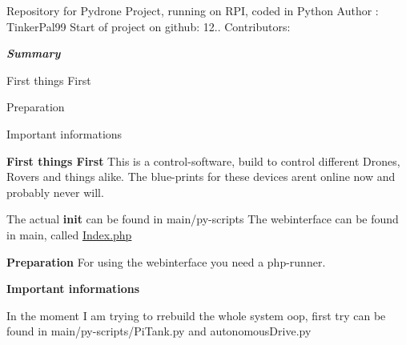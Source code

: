 Repository for Pydrone Project, running on R\+PI, coded in Python Author \+: Tinker\+Pal99 Start of project on github\+: 12.. Contributors\+:

{\bfseries{{\itshape Summary}}}
\begin{DoxyEnumerate}
\item First things First
\item Preparation
\item Important informations
\end{DoxyEnumerate}

{\bfseries{First things First}} This is a control-\/software, build to control different Drones, Rovers and things alike. The blue-\/prints for these devices aren\textquotesingle{}t online now and probably never will.

The actual {\bfseries{init}} can be found in main/py-\/scripts The webinterface can be found in main, called \mbox{\hyperlink{_index_8php}{Index.\+php}}

{\bfseries{Preparation}} For using the webinterface you need a php-\/runner.

{\bfseries{Important informations}}

In the moment I am trying to rrebuild the whole system oop, first try can be found in main/py-\/scripts/\+Pi\+Tank.\+py and autonomous\+Drive.\+py 